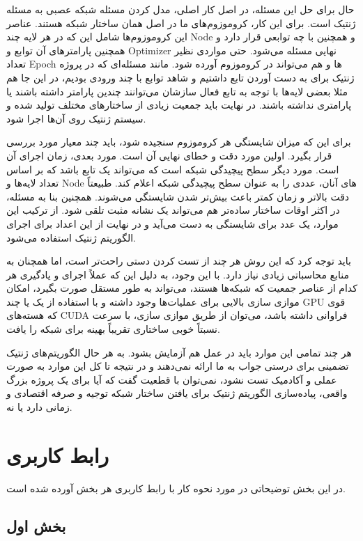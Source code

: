 \documentclass[12pt,titlepage,a4page , tikz , multi,table , svgnames,xcdraw]{article}
\begin{document}
حال برای حل این مسئله، در اصل کار اصلی، مدل کردن مسئله شبکه عصبی به مسئله ژنتیک است. برای این کار، کروموزوم‌های ما در اصل همان ساختار شبکه هستند. عناصر این کروموزوم‌ها شامل این که در هر لایه چند Node و همچنین با چه توابعی قرار دارد و همچنین پارامترهای آن توابع و Optimizer نهایی مسئله می‌شود. حتی مواردی نظیر تعداد Epoch ها و  هم می‌تواند در کروموزوم آورده شود. مانند مسئله‌ای که در پروژه ژنتیک برای به دست آوردن تابع داشتیم و شاهد توابع با چند ورودی بودیم، در این جا هم مثلا بعضی لایه‌ها با توجه به تابع فعال سازشان می‌توانند چندین پارامتر داشته باشند یا پارامتری نداشته باشند. در نهایت باید جمعیت زیادی از ساختارهای مختلف تولید شده و سیستم ژنتیک روی آن‌ها اجرا شود.

برای این که میزان شایستگی هر کروموزوم سنجیده شود، باید چند معیار مورد بررسی قرار بگیرد. اولین مورد دقت و خطای نهایی آن است. مورد بعدی، زمان اجرای آن است. مورد دیگر سطح پیچیدگی شبکه است که می‌تواند یک تابع باشد که بر اساس تعداد لایه‌ها و Node های آنان، عددی را به عنوان سطح پیچیدگی شبکه اعلام کند. طبیعتاً دقت بالاتر و زمان کمتر باعث بیش‌تر شدن شایستگی می‌شوند. همچنین بنا به مسئله، در اکثر اوقات ساختار ساده‌تر هم می‌تواند یک نشانه مثبت تلقی شود. از ترکیب این موارد، یک عدد برای شایستگی به دست می‌آید و در نهایت از این اعداد برای اجرای الگوریتم ژنتیک استفاده می‌شود.

باید توجه کرد که این روش هر چند از تست کردن دستی راحت‌تر است، اما همچنان به منابع محاسباتی زیادی نیاز دارد. با این وجود، به دلیل این که عملاً اجرای و یادگیری هر کدام از عناصر جمعیت که شبکه‌ها هستند، می‌تواند به طور مستقل صورت بگیرد، امکان موازی سازی بالایی برای عملیات‌ها وجود داشته و با استفاده از یک یا چند GPU قوی که هسته‌های CUDA فراوانی داشته باشد، می‌توان از طریق موازی سازی، با سرعت نسبتاً خوبی ساختاری تقریباً بهینه برای شبکه را یافت.

هر چند تمامی این موارد باید در عمل هم آزمایش بشود. به هر حال الگوریتم‌های ژنتیک تضمینی برای درستی جواب به ما ارائه نمی‌دهند و در نتیجه تا کل این موارد به صورت عملی و آکادمیک تست نشود، نمی‌توان با قطعیت گفت که آیا برای یک پروژه بزرگ واقعی، پیاده‌سازی الگوریتم ژنتیک برای یافتن ساختار شبکه توجیه و صرفه اقتصادی و زمانی دارد یا نه.


\section{رابط کاربری}
در این بخش توضیحاتی در مورد نحوه کار با رابط کاربری هر بخش آورده شده است.

\subsection{بخش اول}
\end{document}
